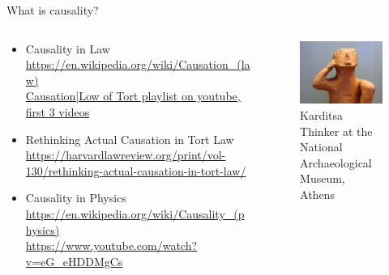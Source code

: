 \documentclass{beamer}
\begin{document}
\begin{frame}{What is causality?}
  \begin{columns}
    \begin{column}{0.7\textwidth}
  \begin{itemize}
    \item Causality in Law  \url{https://en.wikipedia.org/wiki/Causation_(law)} \\
      \href{https://www.youtube.com/watch?v=XiCOmhdkM80&list=PLqMxKp2ot-3vDaLyaAZNgt8ijj6n0l460}{Causation|Low of Tort playlist on youtube, first 3 videos}  
    \item Rethinking Actual Causation in Tort Law \url{https://harvardlawreview.org/print/vol-130/rethinking-actual-causation-in-tort-law/}
    \item Causality in Physics \\
       \url{https://en.wikipedia.org/wiki/Causality_(physics)}  \\
       \url{https://www.youtube.com/watch?v=eG_eHDDMgCs} \\
       \cite{rovelli2022causationrootedthermodynamics}  
  \end{itemize}
  \end{column}
    \begin{column}{0.3\textwidth}
       \begin{figure}
	 \includegraphics[width=3cm]{thinker1}
	 \caption{Karditsa Thinker at the National Archaeological Museum, Athens} 
       \end{figure}
       \vfill
    \end{column}
  \end{columns}
\end{frame}
\end{document}
